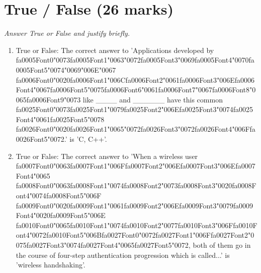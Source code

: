 \documentclass[12pt]{article}
\begin{document}
\section*{True / False (26 marks)}
\textit{Answer True or False and justify briefly.}
\begin{enumerate}[label=\arabic*.]
\item True or False: The correct answer to 'Applications developed by {\csname fa0005Font0\endcsname\char"0073}{\csname fa0005Font1\endcsname\char"0063}{\char"0072}{\csname fa0005Font3\endcsname\char"0069}{\csname fa0005Font4\endcsname\char"0070}{\csname fa0005Font5\endcsname\char"0074}{\char"0069}{\char"006E}{\char"0067} {\csname fa0006Font0\endcsname\char"0020}{\csname fa0006Font1\endcsname\char"006C}{\csname fa0006Font2\endcsname\char"0061}{\csname fa0006Font3\endcsname\char"006E}{\csname fa0006Font4\endcsname\char"0067}{\csname fa0006Font5\endcsname\char"0075}{\csname fa0006Font6\endcsname\char"0061}{\csname fa0006Font7\endcsname\char"0067}{\csname fa0006Font8\endcsname\char"0065}{\csname fa0006Font9\endcsname\char"0073} like \_\_\_\_ and \_\_\_\_\_\_ have this common {\csname fa0025Font0\endcsname\char"0073}{\csname fa0025Font1\endcsname\char"0079}{\csname fa0025Font2\endcsname\char"006E}{\csname fa0025Font3\endcsname\char"0074}{\csname fa0025Font4\endcsname\char"0061}{\csname fa0025Font5\endcsname\char"0078} {\csname fa0026Font0\endcsname\char"0020}{\csname fa0026Font1\endcsname\char"0065}{\char"0072}{\csname fa0026Font3\endcsname\char"0072}{\csname fa0026Font4\endcsname\char"006F}{\csname fa0026Font5\endcsname\char"0072}.' is 'C, C++'.
\item True or False: The correct answer to 'When a wireless user {\csname fa0007Font0\endcsname\char"0063}{\csname fa0007Font1\endcsname\char"006F}{\csname fa0007Font2\endcsname\char"006E}{\csname fa0007Font3\endcsname\char"006E}{\csname fa0007Font4\endcsname\char"0065} {\csname fa0008Font0\endcsname\char"0063}{\csname fa0008Font1\endcsname\char"0074}{\csname fa0008Font2\endcsname\char"0073}{\csname fa0008Font3\endcsname\char"0020}{\csname fa0008Font4\endcsname\char"0074}{\csname fa0008Font5\endcsname\char"006F} {\csname fa0009Font0\endcsname\char"0020}{\csname fa0009Font1\endcsname\char"0061}{\csname fa0009Font2\endcsname\char"006E}{\csname fa0009Font3\endcsname\char"0079}{\csname fa0009Font4\endcsname\char"0020}{\csname fa0009Font5\endcsname\char"006E} {\csname fa0010Font0\endcsname\char"0065}{\csname fa0010Font1\endcsname\char"0074}{\csname fa0010Font2\endcsname\char"0077}{\csname fa0010Font3\endcsname\char"006F}{\csname fa0010Font4\endcsname\char"0072}{\csname fa0010Font5\endcsname\char"006B}{\csname fa0027Font0\endcsname\char"0072}{\csname fa0027Font1\endcsname\char"006F}{\csname fa0027Font2\endcsname\char"0075}{\csname fa0027Font3\endcsname\char"0074}{\csname fa0027Font4\endcsname\char"0065}{\csname fa0027Font5\endcsname\char"0072}, both of them go in the course of four-step authentication progression which is called...' is 'wireless handshaking'.

\end{enumerate}
\end{document}
